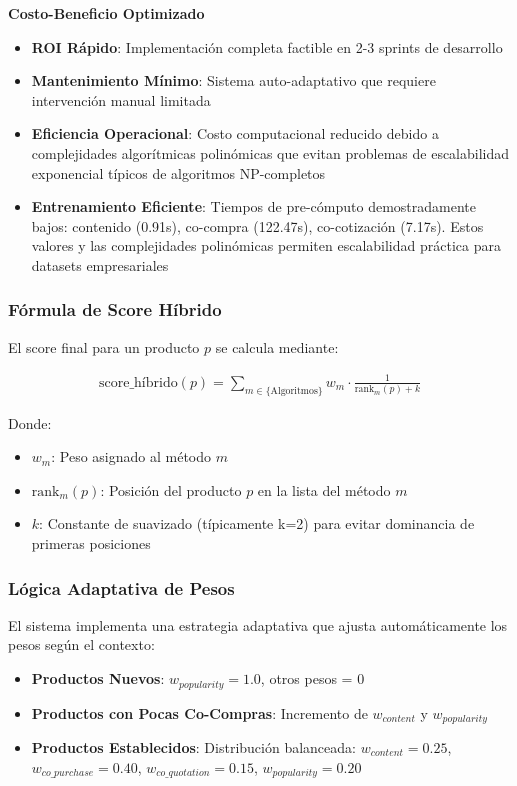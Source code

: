 \documentclass[twocolumn]{article}
\begin{document}
\textbf{Costo-Beneficio Optimizado}
\begin{itemize}
    \item \textbf{ROI Rápido}: Implementación completa factible en 2-3 sprints de desarrollo
    \item \textbf{Mantenimiento Mínimo}: Sistema auto-adaptativo que requiere intervención manual limitada
    \item \textbf{Eficiencia Operacional}: Costo computacional reducido debido a complejidades algorítmicas polinómicas que evitan problemas de escalabilidad exponencial típicos de algoritmos NP-completos
    \item \textbf{Entrenamiento Eficiente}: Tiempos de pre-cómputo demostradamente bajos: contenido (0.91s), co-compra (122.47s), co-cotización (7.17s). Estos valores y las complejidades polinómicas permiten escalabilidad práctica para datasets empresariales
\end{itemize}

\subsubsection{Fórmula de Score Híbrido}

El score final para un producto \(p\) se calcula mediante:

\begin{multline*}
\text{score\_híbrido}(p) = \sum_{m \in \{\text{Algoritmos}\}} w_m \cdot 
\frac{1}{\text{rank}_m(p) + k}
\end{multline*}


Donde:
\begin{itemize}
    \item \(w_m\): Peso asignado al método \(m\)
    \item \(\text{rank}_m(p)\): Posición del producto \(p\) en la lista del método \(m\)
    \item \(k\): Constante de suavizado (típicamente k=2) para evitar dominancia de primeras posiciones
\end{itemize}

\subsubsection{Lógica Adaptativa de Pesos}

El sistema implementa una estrategia adaptativa que ajusta automáticamente los pesos según el contexto:

\begin{itemize}
    \item \textbf{Productos Nuevos}: \(w_{popularity} = 1.0\), otros pesos = 0
    \item \textbf{Productos con Pocas Co-Compras}: Incremento de \(w_{content}\) y \(w_{popularity}\)
    \item \textbf{Productos Establecidos}: Distribución balanceada: \(w_{content} = 0.25\), \(w_{co\_purchase} = 0.40\), \(w_{co\_quotation} = 0.15\), \(w_{popularity} = 0.20\)
\end{itemize}
\end{document}
